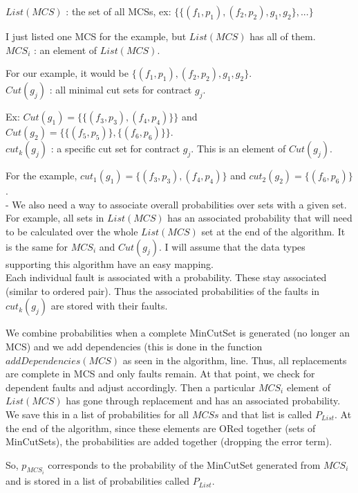 $List(MCS)$ : the set of all MCSs, ex: $\{\{(f_1,p_1),(f_2,p_2),g_1,g_2\}, ...\}$ 

I just listed one MCS for the example, but $List(MCS)$ has all of them. \\

$MCS_i$ : an element of $List(MCS)$. 

For our example, it would be $\{(f_1,p_1),(f_2,p_2),g_1,g_2\}$.\\

$Cut(g_j)$ : all minimal cut sets for contract $g_j$. 

Ex: $Cut(g_1) = \{\{(f_3,p_3),(f_4,p_4)\}\}$ and $Cut(g_2) = \{\{(f_5,p_5)\}, \{(f_6,p_6)\}\}$.    \\

$cut_k(g_j)$ : a specific cut set for contract $g_j$. This is an element of $Cut(g_j)$. 

For the example, $cut_1(g_1) = \{(f_3,p_3),(f_4,p_4)\}$ and $cut_2(g_2) = \{(f_6,p_6)\}$.\\

- We also need a way to associate overall probabilities over sets with a given set. For example, all sets in $List(MCS)$ has an associated probability that will need to be calculated over the whole $List(MCS)$ set at the end of the algorithm. It is the same for $MCS_i$ and $Cut(g_j)$. I will assume that the data types supporting this algorithm have an easy mapping. \\

Each individual fault is associated with a probability. These stay associated (similar to ordered pair). Thus the associated probabilities of the faults in $cut_k(g_j)$ are stored with their faults. 

We combine probabilities when a complete MinCutSet is generated (no longer an MCS) and we add dependencies (this is done in the function $addDependencies(MCS)$ as seen in the algorithm, line. Thus, all replacements are complete in MCS and only faults remain. At that point, we check for dependent faults and adjust accordingly. Then a particular $MCS_i$ element of $List(MCS)$ has gone through replacement and has an associated probability. We save this in a list of probabilities for all $MCSs$ and that list is called $P_{List}$. At the end of the algorithm, since these elements are ORed together (sets of MinCutSets), the probabilities are added together (dropping the error term).

So, $p_{MCS_i}$ corresponds to the probability of the MinCutSet generated from $MCS_i$ and is stored in a list of probabilities called $P_{List}$. \\

